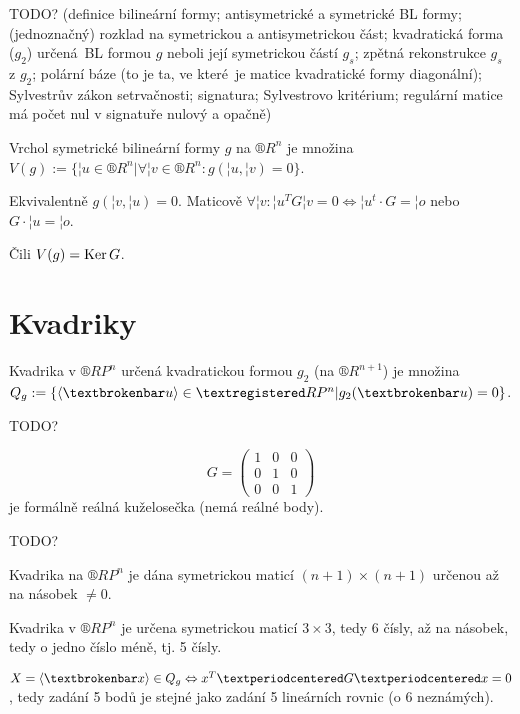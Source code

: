 \documentclass[12pt]{article}					%
\begin{document}

TODO? (definice bilineární formy; antisymetrické a symetrické BL formy; (jednoznačný) rozklad na symetrickou a antisymetrickou část; kvadratická forma ($g_2$) určená BL formou $g$ neboli její symetrickou částí $g_s$; zpětná rekonstrukce $g_s$ z $g_2$; polární báze (to je ta, ve které je matice kvadratické formy diagonální); Sylvestrův zákon setrvačnosti; signatura; Sylvestrovo kritérium; regulární matice má počet nul v signatuře nulový a opačně)

\begin{definice}
	Vrchol symetrické bilineární formy $g$ na $®R^n$ je množina $V(g) := \{¦u \in ®R^n | \forall ¦v \in ®R^n : g(¦u, ¦v) = 0\}$.

	\begin{poznamkain}
		Ekvivalentně $g(¦v, ¦u) = 0$. Maticově $\forall ¦v: ¦u^T G ¦v = 0 \Leftrightarrow ¦u^t·G = ¦o$ nebo $G·¦u = ¦o$.

		Čili $V(g) = \operatorname{Ker} G$.
	\end{poznamkain}
\end{definice}

\section{Kvadriky}
\begin{definice}[Kvadrika]
	Kvadrika v $®RP^n$ určená kvadratickou formou $g_2$ (na $®R^{n+1}$) je množina $Q_g := \{\<¦u\> \in ®RP^n | g_2(¦u) = 0\}$.
\end{definice}

\begin{priklady}
	TODO?

	$$ G = \begin{pmatrix} 1 & 0 & 0 \\ 0 & 1 & 0 \\ 0 & 0 & 1 \end{pmatrix} $$
	je formálně reálná kuželosečka (nemá reálné body).

	TODO?
\end{priklady}

\begin{dusledek}
	Kvadrika na $®RP^n$ je dána symetrickou maticí $(n+1) \times (n+1)$ určenou až na násobek $≠0$.
\end{dusledek}

\begin{dusledek}
	Kvadrika v $®RP^n$ je určena symetrickou maticí $3\times 3$, tedy 6 čísly, až na násobek, tedy o jedno číslo méně, tj. 5 čísly.

	\begin{dusledekin}
		$X = \<¦x\> \in Q_g \Leftrightarrow x^T·G·x = 0$, tedy zadání 5 bodů je stejné jako zadání 5 lineárních rovnic (o 6 neznámých).
	\end{dusledekin}
\end{dusledek}
\end{document}

